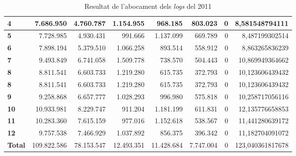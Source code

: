 \begin{table}[h!]
\begin{adjustbox}{width=1.2\textwidth, center}
\begin{tabular}{|l|r|r|r|r|r|r|r|}
            \textbf{4}     & 7.686.950   & 4.760.787  & 1.154.955  & 968.185    & 803.023   & 0 & 8,581548794111   \\
            \midrule
            \textbf{5}     & 7.728.985   & 4.930.431  & 991.666    & 1.137.099  & 669.789   & 0 & 8,487199302514   \\
            \textbf{6}     & 7.898.194   & 5.379.510  & 1.066.258  & 893.514    & 558.912   & 0 & 8,863265836239   \\
            \textbf{7}     & 9.493.849   & 6.741.058  & 1.509.778  & 738.570    & 504.443   & 0 & 10,869949364662  \\
            \textbf{8}     & 8.811.541   & 6.603.733  & 1.219.280  & 615.735    & 372.793   & 0 & 10,123606439432  \\
            \midrule
            \textbf{8}     & 8.811.541   & 6.603.733  & 1.219.280  & 615.735    & 372.793   & 0 & 10,123606439432  \\
            \textbf{9}     & 9.258.868   & 6.657.777  & 1.028.293  & 996.980    & 575.818   & 0 & 10,258717056116  \\
            \textbf{10}    & 10.933.981  & 8.229.747  & 911.204    & 1.181.199  & 611.831   & 0 & 12,135776658853  \\
            \textbf{11}    & 10.283.360  & 7.615.159  & 977.016    & 1.152.618  & 538.567   & 0 & 11,441280639172  \\
            \textbf{12}    & 9.757.538   & 7.466.929  & 1.037.892  & 856.375    & 396.342   & 0 & 11,182704091072  \\
            \midrule
            \textbf{Total} & 109.822.586 & 78.153.547 & 12.493.351 & 11.428.684 & 7.747.004 & 0 & 123,040361817678 \\
            \bottomrule
        \end{tabular}
    \end{adjustbox}
    \caption{Resultat de l'abocament dels \textit{logs} del 2011}
    \label{tab:logs-table-2011}
\end{table}
